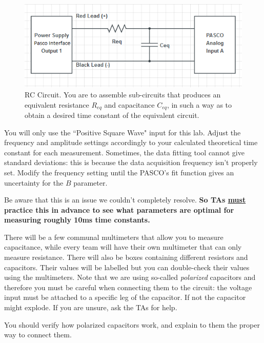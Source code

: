 \documentclass[12pt]{report}
\begin{document}
\begin{figure}[h]
\centering
\includegraphics[width=0.9\linewidth]{lab2-session2-circuit}
\caption{RC Circuit. You are to assemble sub-circuits that produces an equivalent resistance $R_{eq}$ and capacitance $C_{eq}$, in such a way as to obtain a desired time constant of the equivalent circuit.}
\label{Fig:lab2-session2-circuit}
\end{figure}

You will only use the ``Positive Square Wave" input for this lab. 
Adjust the frequency and amplitude settings accordingly to your calculated theoretical time constant for each measurement. 
Sometimes, the data fitting tool cannot give standard deviations: this is because the data acquisition frequency isn't properly set. 
Modify the frequency setting until the PASCO's fit function gives an uncertainty for the $B$ parameter. 
\begin{tcolorbox}
Be aware that this is an issue we couldn't completely resolve. {\bf So  TAs \underline{must} practice this in advance to see what parameters are optimal for measuring roughly 10ms time constants.}
\end{tcolorbox}

There will be a few communal multimeters that allow you to measure capacitance, while every team will have their own multimeter that can only measure resistance. 
There will also be boxes containing different resistors and capacitors. Their values will be labelled but you can double-check their values using the multimeters. 
Note that we are using so-called {\it polarized} capacitors and therefore you must be careful when connecting them to the circuit: the voltage input must be attached to a specific leg of the capacitor. If not the capacitor might explode. If you are unsure, ask the TAs for help. 
\begin{tcolorbox}
You should verify how polarized capacitors work, and explain to them the proper way to connect them.
\end{tcolorbox}
\end{document}

